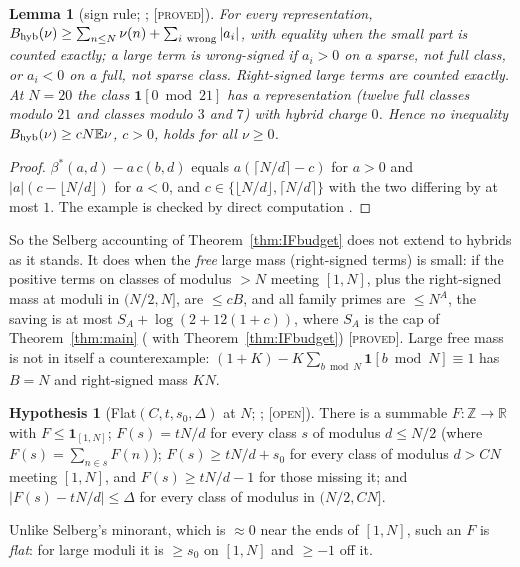 \documentclass[10pt,reqno]{amsart}
\newtheorem{lemma}[theorem]{Lemma}
\theoremstyle{definition}
\newtheorem{hypothesis}[theorem]{Hypothesis}
\theoremstyle{remark}
\newcommand{\E}{\mathbb E}
\newcommand{\Z}{\mathbb Z}
\newcommand{\ind}{\mathbf 1}
\newcommand{\lab}[1]{\textup{[\textsc{#1}]}}
\begin{document}
\begin{lemma}[sign rule; {\cite[Lemma~3.1, Ex.~3.2]{IF2}}; \lab{proved}]\label{lem:signrule}
For every representation,
$B_{\rm hyb}(\nu)\geq\sum_{n\leq N}\nu(n)+\sum_{i\ \text{wrong}}|a_i|$, with equality when the
small part is counted exactly; a large term is \emph{wrong-signed} if
$a_i>0$ on a sparse, not full class, or $a_i<0$ on a full, not sparse class.
Right-signed large terms are counted exactly.  At $N=20$ the class
$\ind[0\bmod21]$ has a representation (twelve full classes modulo $21$ and
classes modulo $3$ and $7$) with hybrid charge $0$.  Hence no inequality
$B_{\rm hyb}(\nu)\geq cN\E\nu$, $c>0$, holds for all $\nu\geq0$.
\end{lemma}
\begin{proof}
$\beta^*(a,d)-a\,c(b,d)$ equals $a(\lceil N/d\rceil-c)$ for $a>0$ and $|a|(c-\lfloor N/d\rfloor)$
for $a<0$, and $c\in\{\lfloor N/d\rfloor,\lceil N/d\rceil\}$ with the two differing by at most
$1$.  The example is checked by direct computation \cite[\S3]{IF2}.
\end{proof}
So the Selberg accounting of Theorem~\ref{thm:IFbudget} does not extend to
hybrids as it stands.  It does when the \emph{free} large mass
(right-signed terms) is small: if the positive terms on classes of
modulus $>N$ meeting $[1,N]$, plus the right-signed mass at moduli in
$(N/2,N]$, are $\leq cB$, and all family primes are $\leq N^A$, the saving is at
most $S_A+\log(2+12(1+c))$, where $S_A$ is the cap of Theorem~\ref{thm:main}
(\cite[Cor.~5.1]{IF2} with Theorem~\ref{thm:IFbudget}) \lab{proved}.
Large free mass is not in itself a counterexample:
$(1+K)-K\sum_{b\bmod N}\ind[b\bmod N]\equiv1$ has $B=N$ and right-signed mass $KN$.

\begin{hypothesis}[Flat$(C,t,s_0,\Delta)$ at $N$; {\cite[\S5]{IF2}}; \lab{open}]\label{hyp:Flat}
There is a summable $F:\Z\to\mathbb R$ with $F\leq\ind_{[1,N]}$; $F(s)=tN/d$ for every
class $s$ of modulus $d\leq N/2$ (where $F(s)=\sum_{n\in s}F(n)$); $F(s)\geq tN/d+s_0$
for every class of modulus $d>CN$ meeting $[1,N]$, and $F(s)\geq tN/d-1$ for
those missing it; and $|F(s)-tN/d|\leq\Delta$ for every class of modulus in
$(N/2,CN]$.
\end{hypothesis}
Unlike Selberg's minorant, which is $\approx0$ near the ends of $[1,N]$, such
an $F$ is \emph{flat}: for large moduli it is $\geq s_0$ on $[1,N]$ and $\geq-1$
off it.
\end{document}
